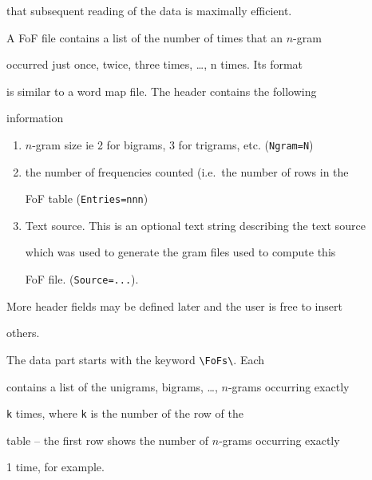 that subsequent reading of the data is maximally efficient.










A FoF file contains a list of the number of times that an $n$-gram


occurred just once, twice, three times, \ldots, n times.  Its format


is similar to a word map file.  The header contains the following


information


\begin{enumerate}


\item $n$-gram size ie 2 for bigrams, 3 for trigrams, etc. (\texttt{Ngram=N})


\item the number of frequencies counted (i.e.\ the number of rows in the


      FoF table (\texttt{Entries=nnn})


\item Text source.  This is an optional text string describing the text source 


which was used to generate the gram files used to compute this


FoF file. (\texttt{Source=...}).


\end{enumerate}


More header fields may be defined later and the user is free to insert


others.





The data part starts with the keyword \verb+\FoFs\+.  Each 


contains a list of the unigrams, bigrams, \ldots, $n$-grams occurring exactly


\texttt{k} times, where \texttt{k} is the number of the row of the


table -- the first row shows the number of $n$-grams occurring exactly


1 time, for example.





